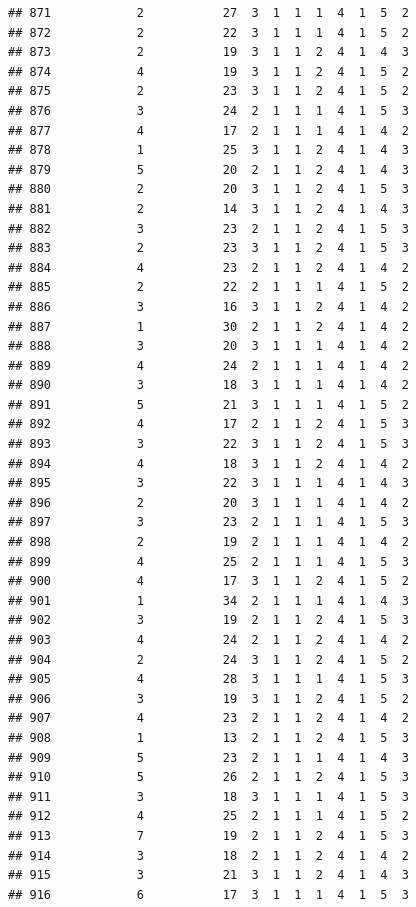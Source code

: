 \documentclass[12pt,]{krantz}
\theoremstyle{definition}
\theoremstyle{definition}
\theoremstyle{remark}
\begin{document}
\begin{verbatim}
## 871            2           27  3  1  1  1  4  1  5  2
## 872            2           22  3  1  1  1  4  1  5  2
## 873            2           19  3  1  1  2  4  1  4  3
## 874            4           19  3  1  1  2  4  1  5  2
## 875            2           23  3  1  1  2  4  1  5  2
## 876            3           24  2  1  1  1  4  1  5  3
## 877            4           17  2  1  1  1  4  1  4  2
## 878            1           25  3  1  1  2  4  1  4  3
## 879            5           20  2  1  1  2  4  1  4  3
## 880            2           20  3  1  1  2  4  1  5  3
## 881            2           14  3  1  1  2  4  1  4  3
## 882            3           23  2  1  1  2  4  1  5  3
## 883            2           23  3  1  1  2  4  1  5  3
## 884            4           23  2  1  1  2  4  1  4  2
## 885            2           22  2  1  1  1  4  1  5  2
## 886            3           16  3  1  1  2  4  1  4  2
## 887            1           30  2  1  1  2  4  1  4  2
## 888            3           20  3  1  1  1  4  1  4  2
## 889            4           24  2  1  1  1  4  1  4  2
## 890            3           18  3  1  1  1  4  1  4  2
## 891            5           21  3  1  1  1  4  1  5  2
## 892            4           17  2  1  1  2  4  1  5  3
## 893            3           22  3  1  1  2  4  1  5  3
## 894            4           18  3  1  1  2  4  1  4  2
## 895            3           22  3  1  1  1  4  1  4  3
## 896            2           20  3  1  1  1  4  1  4  2
## 897            3           23  2  1  1  1  4  1  5  3
## 898            2           19  2  1  1  1  4  1  4  2
## 899            4           25  2  1  1  1  4  1  5  3
## 900            4           17  3  1  1  2  4  1  5  2
## 901            1           34  2  1  1  1  4  1  4  3
## 902            3           19  2  1  1  2  4  1  5  3
## 903            4           24  2  1  1  2  4  1  4  2
## 904            2           24  3  1  1  2  4  1  5  2
## 905            4           28  3  1  1  1  4  1  5  3
## 906            3           19  3  1  1  2  4  1  5  2
## 907            4           23  2  1  1  2  4  1  4  2
## 908            1           13  2  1  1  2  4  1  5  3
## 909            5           23  2  1  1  1  4  1  4  3
## 910            5           26  2  1  1  2  4  1  5  3
## 911            3           18  3  1  1  1  4  1  5  3
## 912            4           25  2  1  1  1  4  1  5  2
## 913            7           19  2  1  1  2  4  1  5  3
## 914            3           18  2  1  1  2  4  1  4  2
## 915            3           21  3  1  1  2  4  1  4  3
## 916            6           17  3  1  1  1  4  1  5  3

\end{verbatim}
\end{document}
